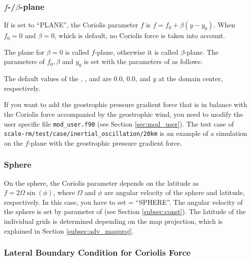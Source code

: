 \subsubsection{$f$-/$\beta$-plane}
If  is set to ``PLANE'', the Coriolis parameter $f$ is $f=f_0 + \beta (y-y_0)$.
When $f_0=0$ and $\beta=0$, which is default, no Coriolis force is taken into account.

The plane for $\beta=0$ is called $f$-plane, otherwise it is called $\beta$-plane.
The parameters of $f_0, \beta$ and $y_0$ is set with the parameters of  as follows:

The default values of the , , 
and  are 0.0, 0.0, and $y$ at the domain center, respectively.

If you want to add the geostrophic pressure gradient force that is in balance with the Coriolis force accompanied by the geostrophic wind, you need to modify the user specific file \verb|mod_user.f90| (see Section \ref{sec:mod_user}).
The test case of \verb|scale-rm/test/case/inertial_oscillation/20km| is an example of a simulation on the $f$-plane with the geostrophic pressure gradient force.


\subsubsection{Sphere}
On the sphere, the Coriolis parameter depends on the latitude as $f = 2\Omega \sin(\phi)$, where $\Omega$ and $\phi$ are angular velocity of the sphere and latitude, respectively.
In this case, you have to set  = ``SPHERE''.
The angular velocity of the sphere is set by  parameter of  (see Section \ref{subsec:const}).
The latitude of the individual grids is determined depending on the map projection, which is explained in Section \ref{subsec:adv_mapproj}.



\subsubsection{Lateral Boundary Condition for Coriolis Force}

